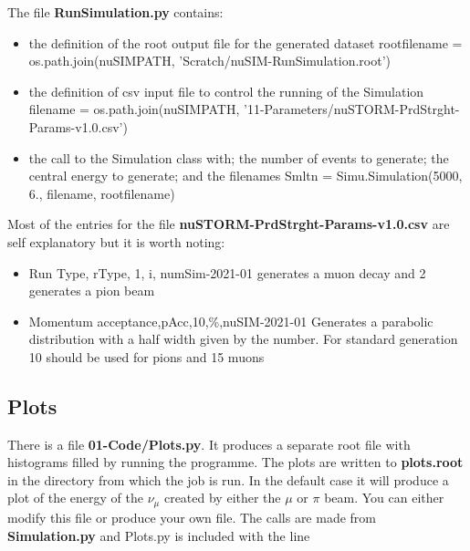 \noindent The file {\bf RunSimulation.py} contains:
\begin{itemize}
\item the definition of the root output file for the generated dataset \newline
rootfilename = os.path.join(nuSIMPATH, 'Scratch/nuSIM-RunSimulation.root')
\item the definition of csv  input file to control the running of the Simulation \newline
filename  = os.path.join(nuSIMPATH, '11-Parameters/nuSTORM-PrdStrght-Params-v1.0.csv')
\item the call to the Simulation class with; the number of events to generate; the central energy to generate; and the filenames\newline
Smltn = Simu.Simulation(5000, 6., filename, rootfilename)
\end{itemize}
\hfill\newline
\noindent Most of the entries for the file {\bf nuSTORM-PrdStrght-Params-v1.0.csv} are self explanatory but it is worth noting:
\begin{itemize}
\item Run Type, rType, 1, i, numSim-2021-01 generates a muon decay and 2 generates a pion beam\newline
\item Momentum acceptance,pAcc,10,\%,nuSIM-2021-01\newline
Generates a parabolic distribution with a half width given by the number. For standard generation 10 should be used for pions and 15 muons
\end{itemize}

  
 \subsection{Plots}
 There is a file {\bf 01-Code/Plots.py}. It produces a separate root file with histograms filled by running the programme. The
 plots are written to {\bf plots.root} in the directory from which the job is run. In the default case it will produce a plot
 of the energy of the $\nu_{\mu}$ created by either the $\mu$ or $\pi$ beam. You can either modify this file or produce your own file. The calls are made from {\bf Simulation.py} and Plots.py is included with the line 
 \hfill\newline
 
